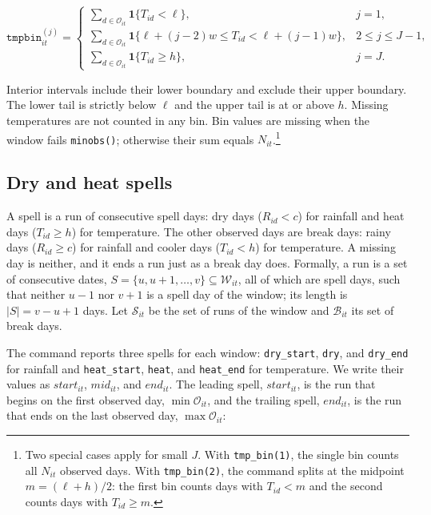 \begin{equation}
	\texttt{tmpbin}_{it}^{(j)} =
	\begin{cases}
		\displaystyle \sum_{d \in \mathcal{O}_{it}} \mathbf{1}\{T_{id} < \ell\} , & j = 1 , \\[8pt]
		\displaystyle \sum_{d \in \mathcal{O}_{it}} \mathbf{1}\{\ell + (j - 2) w \leq T_{id} < \ell + (j - 1) w\} , & 2 \leq j \leq J - 1 , \\[8pt]
		\displaystyle \sum_{d \in \mathcal{O}_{it}} \mathbf{1}\{T_{id} \geq h\} , & j = J .
	\end{cases}
\end{equation}

\noindent Interior intervals include their lower boundary and exclude their upper boundary. The lower tail is strictly below $\ell$ and the upper tail is at or above $h$.  Missing temperatures are not counted in any bin. Bin values are missing when the window fails \texttt{minobs()}; otherwise their sum equals $N_{it}$.\footnote{Two special cases apply for small $J$. With \texttt{tmp\_bin(1)}, the single bin counts all $N_{it}$ observed days. With \texttt{tmp\_bin(2)}, the command splits at the midpoint $m = (\ell + h) / 2$: the first bin counts days with $T_{id} < m$ and the second counts days with $T_{id} \geq m$.}

\subsection{Dry and heat spells} \label{sec:spells}

A spell is a run of consecutive spell days: dry days ($R_{id} < c$) for rainfall and heat days ($T_{id} \geq h$) for temperature. The other observed days are break days: rainy days ($R_{id} \geq c$) for rainfall and cooler days ($T_{id} < h$) for temperature. A missing day is neither, and it ends a run just as a break day does. Formally, a run is a set of consecutive dates, $S = \{u, u + 1, \ldots, v\} \subseteq \mathcal{W}_{it}$, all of which are spell days, such that neither $u - 1$ nor $v + 1$ is a spell day of the window; its length is $|S| = v - u + 1$ days. Let $\mathcal{S}_{it}$ be the set of runs of the window and $\mathcal{B}_{it}$ its set of break days.

The command reports three spells for each window: \texttt{dry\_start}, \texttt{dry}, and \texttt{dry\_end} for rainfall and \texttt{heat\_start}, \texttt{heat}, and \texttt{heat\_end} for temperature. We write their values as $\mathit{start}_{it}$, $\mathit{mid}_{it}$, and $\mathit{end}_{it}$. The leading spell, $\mathit{start}_{it}$, is the run that begins on the first observed day, $\min \mathcal{O}_{it}$, and the trailing spell, $\mathit{end}_{it}$, is the run that ends on the last observed day, $\max \mathcal{O}_{it}$:

